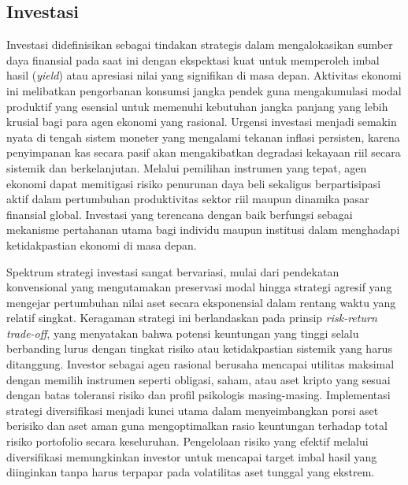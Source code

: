 \subsection{Investasi}
Investasi didefinisikan sebagai tindakan strategis dalam mengalokasikan sumber daya finansial pada saat ini dengan ekspektasi kuat untuk memperoleh imbal hasil (\textit{yield}) atau apresiasi nilai yang signifikan di masa depan. Aktivitas ekonomi ini melibatkan pengorbanan konsumsi jangka pendek guna mengakumulasi modal produktif yang esensial untuk memenuhi kebutuhan jangka panjang yang lebih krusial bagi para agen ekonomi yang rasional. Urgensi investasi menjadi semakin nyata di tengah sistem moneter yang mengalami tekanan inflasi persisten, karena penyimpanan kas secara pasif akan mengakibatkan degradasi kekayaan riil secara sistemik dan berkelanjutan. Melalui pemilihan instrumen yang tepat, agen ekonomi dapat memitigasi risiko penurunan daya beli sekaligus berpartisipasi aktif dalam pertumbuhan produktivitas sektor riil maupun dinamika pasar finansial global. Investasi yang terencana dengan baik berfungsi sebagai mekanisme pertahanan utama bagi individu maupun institusi dalam menghadapi ketidakpastian ekonomi di masa depan.

Spektrum strategi investasi sangat bervariasi, mulai dari pendekatan konvensional yang mengutamakan preservasi modal hingga strategi agresif yang mengejar pertumbuhan nilai aset secara eksponensial dalam rentang waktu yang relatif singkat. Keragaman strategi ini berlandaskan pada prinsip \textit{risk-return trade-off}, yang menyatakan bahwa potensi keuntungan yang tinggi selalu berbanding lurus dengan tingkat risiko atau ketidakpastian sistemik yang harus ditanggung. Investor sebagai agen rasional berusaha mencapai utilitas maksimal dengan memilih instrumen seperti obligasi, saham, atau aset kripto yang sesuai dengan batas toleransi risiko dan profil psikologis masing-masing. Implementasi strategi diversifikasi menjadi kunci utama dalam menyeimbangkan porsi aset berisiko dan aset aman guna mengoptimalkan rasio keuntungan terhadap total risiko portofolio secara keseluruhan. Pengelolaan risiko yang efektif melalui diversifikasi memungkinkan investor untuk mencapai target imbal hasil yang diinginkan tanpa harus terpapar pada volatilitas aset tunggal yang ekstrem.

